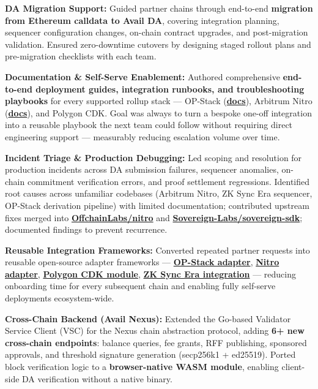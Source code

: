 \documentclass[letterpaper,11pt]{article}
\newcommand{\resumeItem}[1]{
  \item\small{{#1 \vspace{-2pt}}}
}
\begin{document}
    \resumeItem{\textbf{DA Migration Support:} Guided partner chains through end-to-end \textbf{migration from Ethereum calldata to Avail DA}, covering integration planning, sequencer configuration changes, on-chain contract upgrades, and post-migration validation. Ensured zero-downtime cutovers by designing staged rollout plans and pre-migration checklists with each team.}

    \resumeItem{\textbf{Documentation \& Self-Serve Enablement:} Authored comprehensive \textbf{end-to-end deployment guides, integration runbooks, and troubleshooting playbooks} for every supported rollup stack — OP-Stack (\href{https://docs.availproject.org/docs/build-with-avail/deploy-rollup-on-avail/Optimium/op-stack/op-stack}{\textbf{docs}}), Arbitrum Nitro (\href{https://docs.availproject.org/docs/build-with-avail/deploy-rollup-on-avail/Optimium/arbitrum-nitro/nitro-stack}{\textbf{docs}}), and Polygon CDK. Goal was always to turn a bespoke one-off integration into a reusable playbook the next team could follow without requiring direct engineering support — measurably reducing escalation volume over time.}

    \resumeItem{\textbf{Incident Triage \& Production Debugging:} Led scoping and resolution for production incidents across DA submission failures, sequencer anomalies, on-chain commitment verification errors, and proof settlement regressions. Identified root causes across unfamiliar codebases (Arbitrum Nitro, ZK Sync Era sequencer, OP-Stack derivation pipeline) with limited documentation; contributed upstream fixes merged into \href{https://github.com/OffchainLabs/nitro/pull/2666}{\textbf{OffchainLabs/nitro}} and \href{https://github.com/Sovereign-Labs/sovereign-sdk/pull/1709}{\textbf{Sovereign-Labs/sovereign-sdk}}; documented findings to prevent recurrence.}

    \resumeItem{\textbf{Reusable Integration Frameworks:} Converted repeated partner requests into reusable open-source adapter frameworks — \href{https://github.com/availproject/avail-op-stack-adapter}{\textbf{OP-Stack adapter}}, \href{https://github.com/availproject/avail-nitro-adapter}{\textbf{Nitro adapter}}, \href{https://github.com/availproject/cdk}{\textbf{Polygon CDK module}}, \href{https://github.com/availproject/zksync-era}{\textbf{ZK Sync Era integration}} — reducing onboarding time for every subsequent chain and enabling fully self-serve deployments ecosystem-wide.}

    \resumeItem{\textbf{Cross-Chain Backend (Avail Nexus):} Extended the Go-based Validator Service Client (VSC) for the Nexus chain abstraction protocol, adding \textbf{6+ new cross-chain endpoints}: balance queries, fee grants, RFF publishing, sponsored approvals, and threshold signature generation (secp256k1 + ed25519). Ported block verification logic to a \textbf{browser-native WASM module}, enabling client-side DA verification without a native binary.}
\end{document}
